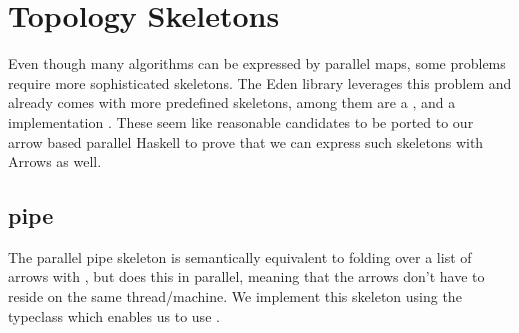 \section{Topology Skeletons}
Even though many algorithms can be expressed by parallel maps, some problems require more sophisticated skeletons. The Eden library leverages this problem and already comes with more predefined skeletons, among them are a ,  and a  implementation \cite{eden_cefp, eden_skel_topology}. These seem like reasonable candidates to be ported to our arrow based parallel Haskell to prove that we can express such skeletons with Arrows as well.

\subsection{pipe}

The parallel pipe skeleton is semantically equivalent to folding over a list \code{[arr a a]} of arrows with \code{>>>}, but does this in parallel, meaning that the arrows don't have to reside on the same thread/machine. We implement this skeleton using the  typeclass which enables us to use .


